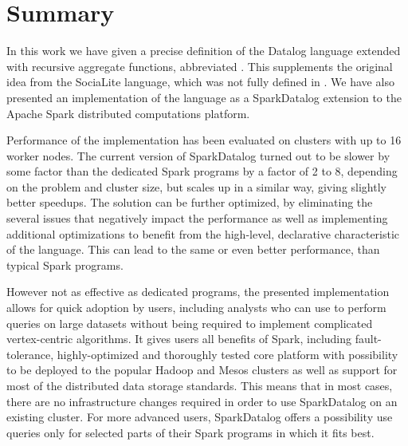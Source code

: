 

\chapter{Summary}\label{r:summary}



In this work we have given a precise definition of the Datalog language extended with recursive aggregate functions, abbreviated \datalogra. This supplements the original idea from the SociaLite language, which was not fully defined in \cite{socialite, distsoc}. We have also presented an implementation of the \datalogra language as a SparkDatalog extension to the Apache Spark distributed computations platform.

Performance of the implementation has been evaluated on clusters with up to 16 worker nodes. The current version of SparkDatalog turned out to be slower by some factor than the dedicated Spark programs by a factor of 2 to 8, depending on the problem and cluster size, but scales up in a similar way, giving slightly better speedups. The solution can be further optimized, by eliminating the several issues that negatively impact the performance as well as implementing additional optimizations to benefit from the high-level, declarative characteristic of the language. This can lead to the same or even better performance, than typical Spark programs.

However not as effective as dedicated programs, the presented implementation allows for quick adoption by users, including analysts who can use \datalogra to perform queries on large datasets without being required to implement complicated vertex-centric algorithms. It gives users all benefits of Spark, including fault-tolerance, highly-optimized and thoroughly tested core platform with possibility to be deployed to the popular Hadoop and Mesos clusters as well as support for most of the distributed data storage standards. This means that in most cases, there are no infrastructure changes required in order to use SparkDatalog on an existing cluster. For more advanced users, SparkDatalog offers a possibility use \datalogra queries only for selected parts of their Spark programs in which it fits best.


